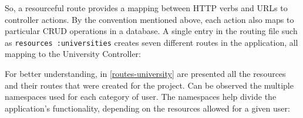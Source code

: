 So, a resourceful route provides a mapping between HTTP verbs and URLs to controller actions. By the convention mentioned above, each action also maps to particular CRUD operations in a database. A single entry in the routing file such as \texttt{resources :universities} creates seven different routes in the application, all mapping to the University Controller:

\begin{table}[H]
\centering
\caption{Routes mapping the actions from University Controller}
\label{table:routes-university}
\end{table}

For better understanding, in \autoref{routes-university} are presented all the resources and their routes that were created for the project. Can be observed the multiple namespaces used for each category of user. The namespaces help divide the application's functionality, depending on the resources allowed for a given user:

